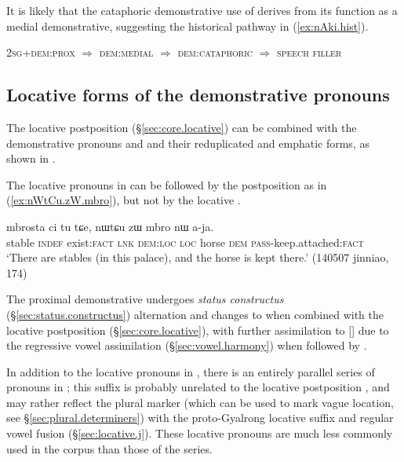 It is likely that the cataphoric demonstrative use of  derives  from its function as a medial demonstrative, suggesting the historical pathway in (\ref{ex:nAki.hist}).

\begin{exe}
\ex \label{ex:nAki.hist}
\glt \textsc{2sg}+\textsc{dem}:\textsc{prox} $\Rightarrow$ \textsc{dem}:\textsc{medial} $\Rightarrow$ \textsc{dem}:\textsc{cataphoric} $\Rightarrow$ \textsc{speech filler}
\end{exe}

\subsection{Locative forms of the demonstrative pronouns} \label{sec:locative.pronoun}
The locative postposition  (§\ref{sec:core.locative}) can be combined with the demonstrative pronouns  and  and their reduplicated and emphatic forms, as shown in .  

The locative pronouns in  can be followed by the postposition  as in (\ref{ex:nWtCu.zW.mbro}), but not by the locative .
 
\begin{exe}
\ex \label{ex:nWtCu.zW.mbro}
 \gll mbrosta ci tu tɕe, nɯtɕu zɯ mbro nɯ a-ja. \\
 stable \textsc{indef} exist:\textsc{fact} \textsc{lnk} \textsc{dem}:\textsc{loc} \textsc{loc} horse \textsc{dem} \textsc{pass}-keep.attached:\textsc{fact} \\
 \glt `There are stables (in this palace), and the horse is kept there.' (140507 jinniao, 174)
\end{exe} 

The proximal demonstrative  undergoes \textit{status constructus} (§\ref{sec:status.constructus}) alternation and changes to  when combined with the locative postposition  (§\ref{sec:core.locative}), with further assimilation to [] due to the regressive vowel assimilation (§\ref{sec:vowel.harmony}) when followed by  .

 In addition to the locative pronouns in  , there is an entirely parallel series of pronouns in ; this suffix is probably unrelated to the locative postposition , and may rather reflect the plural marker  (which can be used to mark vague location, see §\ref{sec:plural.determiners}) with the proto-Gyalrong locative suffix  and regular vowel fusion (§\ref{sec:locative.j}). These locative pronouns are much less commonly used in the corpus than those of the   series.
 
